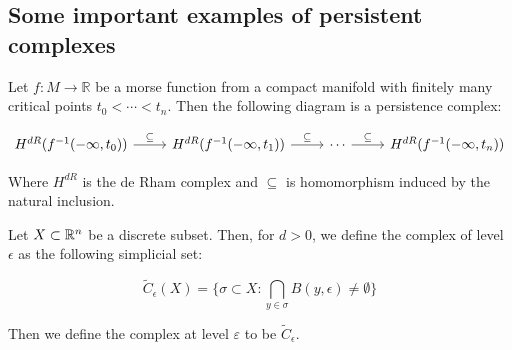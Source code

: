 \subsection{Some important examples of persistent complexes}
\label{examplespersistence}

\begin{definition}
Let $f:M\to\mathbb{R}$ be a morse function from a compact manifold 
with finitely many critical points $t_0<\cdots<t_n$. Then the following diagram
is a persistence complex:

$$
\begin{tikzcd}
H^{dR}(f^{-1}(-\infty,t_0)) \arrow[r,"\subseteq"]
& H^{dR}(f^{-1}(-\infty,t_1)) \arrow[r,"\subseteq"]
& \cdots\arrow[r,"\subseteq"]
& H^{dR}(f^{-1}(-\infty,t_n))
\end{tikzcd}
$$

Where $H^{dR}$ is the de Rham complex and $\subseteq$
is homomorphism induced by the natural inclusion.

\end{definition}

\begin{definition}

Let $X\subset \mathbb{R}^n$ be a discrete subset. Then, for $d>0$, we define the {\Cech}
complex of level $\epsilon$ as the following simplicial set:


$$
\tilde{C}_\epsilon(X)
=
\{
\sigma \subset X :
\bigcap_{y\in\sigma} B(y,\epsilon)\neq \emptyset
\}
$$

Then we define the {\Cech} complex at level $\varepsilon$ to be $\tilde{C}_\epsilon$.

\end{definition}

%
%
%


